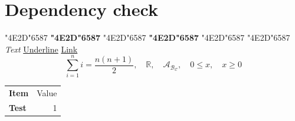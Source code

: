 \documentclass[UTF8,fontset=fandol,oneside,openany]{ctexbook}
\begin{document}
\section{Dependency check}
{\songti\char"4E2D\char"6587}
{\songti\bfseries\char"4E2D\char"6587}
{\heiti\char"4E2D\char"6587}
{\heiti\bfseries\char"4E2D\char"6587}
{\kaishu\char"4E2D\char"6587}
{\fangsong\char"4E2D\char"6587}
\emph{Text} \uline{Underline} \href{https://example.com}{Link}
\[\sum_{i=1}^{n} i = \frac{n(n+1)}{2},\quad \mathbb{R},\quad \mathscr{A}_{\mathscr{B}_{\mathscr{C}}},\quad 0 \leqslant x,\quad x \geqslant 0\]
\begin{longtable}{>{\bfseries}l r}
Item & Value \\
Test & 1
\end{longtable}
\end{document}
